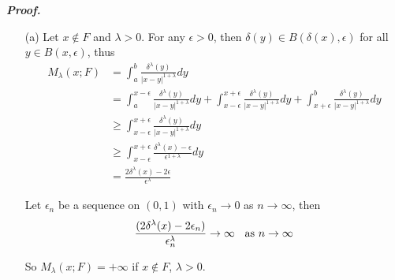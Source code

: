 \documentclass[a4paper,11pt]{article}
\begin{document}
\begin{enumerate}
 		\textit{\textbf {Proof.}}

 		\begin{enumerate}
 			\item [(a)]
	 			Let $x \notin F$ and $\lambda > 0$. For any $\epsilon > 0$, then $\delta(y) \in B(\delta(x), \epsilon)$ for all $y \in B(x,\epsilon)$, thus
	 			$$\begin{aligned}
	 			M_\lambda (x;F)
	 			&= \int_a^b \frac{\delta^\lambda (y)}{|x - y|^{1+\lambda}} dy\\
	 			&= \int_a^{x-\epsilon} \frac{\delta^\lambda (y)}{|x - y|^{1+\lambda}} dy + \int_{x-\epsilon}^{x+\epsilon} \frac{\delta^\lambda (y)}{|x - y|^{1+\lambda}} dy + \int_{x+\epsilon}^b \frac{\delta^\lambda (y)}{|x - y|^{1+\lambda}} dy\\
	 			&\geq \int_{x-\epsilon}^{x+\epsilon} \frac{\delta^\lambda (y)}{|x - y|^{1+\lambda}} dy\\
	 			&\geq \int_{x-\epsilon}^{x+\epsilon} \frac{\delta^\lambda (x) - \epsilon}{\epsilon^{1+\lambda}} dy\\
	 			&= \frac{2 \delta^\lambda (x) - 2 \epsilon}{\epsilon^\lambda}
	 			\end{aligned}$$

	 			Let $\epsilon_n$ be a sequence on $(0,1)$ with $\epsilon_n \to 0$ as $n \to \infty$, then
	 			$$\frac{(2\delta^\lambda(x) - 2 \epsilon_n)}{\epsilon_n^\lambda} \to \infty \hspace{0.2cm} \mbox{ as } n \to \infty$$

	 			So $M_\lambda (x; F) = +\infty$ if $x \notin F$, $\lambda > 0$.\\



\end{enumerate}
\end{enumerate}
\end{document}
